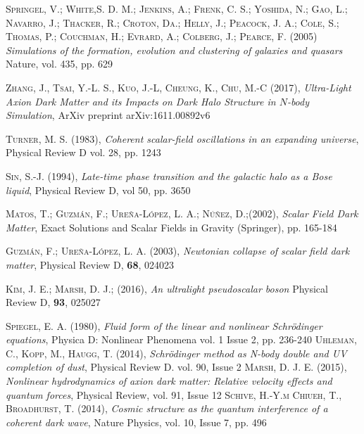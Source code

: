 \documentclass[a4paper,openright,12pt]{book}
\begin{document}
\begin{thebibliography}{a}
 \textsc{Springel, V.; White,S. D. M.; Jenkins, A.; Frenk, C. S.; Yoshida, N.; Gao, L.; Navarro, J.; Thacker, R.; Croton, Da.; Helly, J.; Peacock, J. A.; Cole, S.; Thomas, P.; Couchman, H.; Evrard, A.; Colberg, J.; Pearce, F. (2005)}
\textit{Simulations of the formation, evolution and clustering of galaxies and quasars}
Nature, vol. 435, pp. 629

 \textsc{Zhang, J., Tsai, Y.-L. S., Kuo, J.-L, Cheung, K., Chu, M.-C (2017)},
\textit{Ultra-Light Axion Dark Matter and its Impacts on Dark Halo Structure in $N$-body Simulation},
ArXiv preprint  arXiv:1611.00892v6

\textsc{Turner, M. S. (1983)},
\textit{Coherent scalar-field oscillations in an expanding universe},
Physical Review D vol. 28, pp. 1243

 \textsc{Sin, S.-J. (1994)},
\textit{Late-time phase transition and the galactic halo as a Bose liquid},
Physical Review D, vol 50, pp. 3650

 \textsc{Matos, T.; Guzmán, F.; Ureña-López, L. A.; Núñez, D.;(2002)},
\textit{Scalar Field Dark Matter},
Exact Solutions and Scalar Fields in Gravity (Springer), pp. 165-184

 \textsc{Guzmán, F.; Ureña-López, L. A. (2003)},
\textit{Newtonian collapse of scalar field dark matter},
Physical Review D, \textbf{68}, 024023

 \textsc{Kim, J. E.; Marsh, D. J.; (2016)},
\textit{An ultralight pseudoscalar boson}
Physical Review D, \textbf{93}, 025027


 \textsc{Spiegel, E. A. (1980)},
\textit{Fluid form of the linear and nonlinear Schrödinger equations},
Physica D: Nonlinear Phenomena vol. 1 Issue 2, pp. 236-240 
 \textsc{Uhleman, C., Kopp, M., Haugg, T. (2014)},
\textit{Schrödinger method as N-body double and UV completion of dust},
Physical Review D. vol. 90, Issue 2 
\textsc{Marsh, D. J. E. (2015)},
\textit{Nonlinear hydrodynamics of axion dark matter: Relative velocity effects and quantum forces},
Physical Review, vol. 91, Issue 12
 \textsc{Schive, H.-Y.m Chiueh, T., Broadhurst, T. (2014)},
\textit{Cosmic structure as the quantum interference of a coherent dark wave},
Nature Physics, vol. 10, Issue 7, pp. 496


\end{thebibliography}
\end{document}
